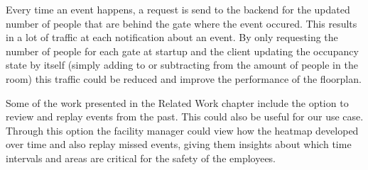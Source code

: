 Every time an event happens, a request is send to the backend for the updated number of people that are behind the gate where the event occured. This results in a lot of traffic at each notification about an event. By only requesting the number of people for each gate at startup and the client updating the occupancy state by itself (simply adding to or subtracting from the  amount of people in the room) this traffic could be reduced and improve the performance of the floorplan. 

Some of the work presented in the Related Work chapter include the option to review and replay events from the past. This could also be useful for our use case. Through this option the facility manager could view how the heatmap developed over time and also replay missed events, giving them insights about which time intervals and areas are critical for the safety of the employees.

\clearpage


